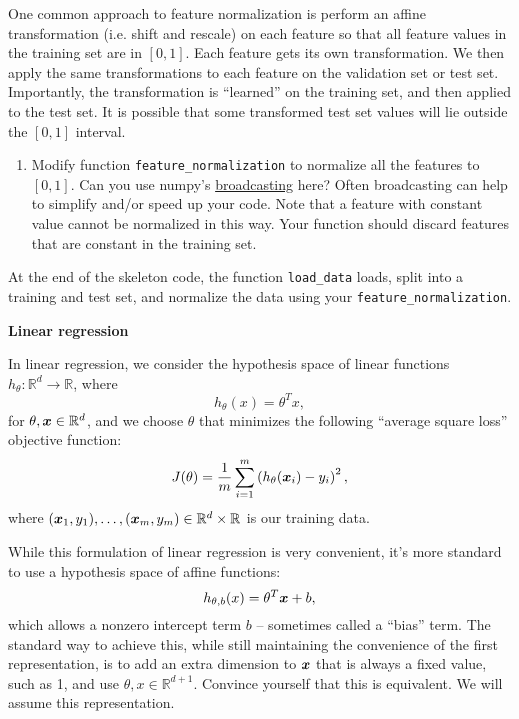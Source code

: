 \documentclass{article}
\newcommand{\nyuparagrah}[1]{\textcolor{nyupurple}{\large #1}}
\begin{document}
One common approach to feature normalization is perform
an affine transformation (i.e. shift and rescale) on each feature
so that all feature values in the training set are in $[0,1]$. Each
feature gets its own transformation. We then apply the same transformations
to each feature on the validation set or test set. Importantly, the transformation is ``learned'' on the
training set, and then applied to the test set. It is possible that
some transformed test set values will lie outside the $[0,1]$ interval.

\begin{enumerate}
\setcounter{enumi}{\value{saveenum}}
    \item Modify function \texttt{feature\_normalization} to normalize all the
features to $[0,1]$. Can you use numpy's \href{https://docs.scipy.org/doc/numpy/user/basics.broadcasting.html}{broadcasting} here? Often broadcasting can help to simplify and/or speed up your code. Note that a feature with constant value cannot be normalized in
this way. Your function should discard features that are constant
in the training set.
\setcounter{saveenum}{\value{enumi}}
\end{enumerate}

At the end of the skeleton code, the function \texttt{load\_data} loads, split into a training and test set, and normalize the data using your \texttt{feature\_normalization}.

\nyuparagrah{\bf Linear regression}

In linear regression, we consider the hypothesis space of linear functions
$h_{\theta}:\mathbb{R}^{d}\to\mathbb{R}$, where
\[
h_{\theta}(x)=\theta^{T}x,
\]
for $\theta,\boldsymbol{x}\in\mathbb{R}^{d}$, and we choose $\theta$ that minimizes
the following ``average square loss'' objective function: 
\[
J(\theta)=\frac{1}{m}\sum_{i=1}^{m}\left(h_{\theta}(\boldsymbol{x}_{i})-y_{i}\right)^{2},
\]
where $(\boldsymbol{x}_{1},y_{1}),\ldots,(\boldsymbol{x}_{m},y_{m})\in\mathbb{R}^{d}\times\mathbb{R}$
is our training data.

While this formulation of linear regression is very convenient, it's
more standard to use a hypothesis space of affine functions:
\[
h_{\theta,b}(x)=\theta^{T} \boldsymbol{x}+b,
\]
which allows a nonzero intercept term $b$ -- sometimes called a ``bias'' term. The standard
way to achieve this, while still maintaining the convenience of the
first representation, is to add an extra dimension to $\boldsymbol{x}$ that is
always a fixed value, such as 1, and use $\theta,x\in\mathbb{R}^{d+1}$. Convince yourself that
this is equivalent. 
We will assume this representation. 
\end{document}
